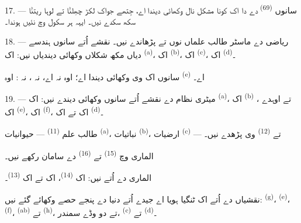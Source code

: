 17. --- سانوں  \textsuperscript{(69)} دے  دا اک
کونا مشکل نال وکھائی دیندا اے، جِتھے جواک لکڑ چھِلݨا تے لوہا ریتݨا سکھ سکدے
نیں۔ ایہہ ہر سکول وچ نئیں ہوندا۔

\VUsaut{5.0mm}
\VUsaut{3.6mm}

18. --- ریاضی دے ماسٹر طالب علماں نوں  تے
 پڑھاندے نیں۔ نقشے اُتے سانوں ہندسے دیاں مکھ شکلاں وکھائی
دیندیاں نیں: اک  \textsuperscript{(a)}، اک 
\textsuperscript{(b)}، اک  \textsuperscript{(c)}، اک 
\textsuperscript{(d)}۔

سانوں اک  وی وکھائی دیندا اے؛ اوہ نہ  اے، نہ
، نہ : اوہ  \textsuperscript{(e)} اے۔

19. --- میٹری نظام دے نقشے اُتے سانوں وکھائی دیندے نیں: اک 
\textsuperscript{(a)}، اک  \textsuperscript{(b)} تے اوہدے
، اک  \textsuperscript{(e)}، اک 
\textsuperscript{(f)}، اک  تے اک 
\textsuperscript{(d)}۔

طالب علم  \textsuperscript{(11)} --- حیوانیات
\textsuperscript{(a)}، نباتیات \textsuperscript{(b)}، ارضیات \textsuperscript{(c)}
--- تے  \textsuperscript{(12)} وی پڑھدے نیں۔

الماری وچ  \textsuperscript{(15)} تے 
\textsuperscript{(16)} دے سامان رکھے نیں۔

الماری دے اُتے نیں: اک  \textsuperscript{(14)}، اک 
تے اک  \textsuperscript{(13)}۔

نقشیاں دے اُتے اک  ٹنگیا ہویا اے جیدے اُتے دنیا دے پنجے حصے وکھائے
گئے نیں:  \textsuperscript{(g)}، 
\textsuperscript{(e)}،  \textsuperscript{(f)}، 
\textsuperscript{(ab)} تے  \textsuperscript{(h)}، تے دو وڈے
سمندر،  \textsuperscript{(c)} تے 
\textsuperscript{(d)}۔
\VUsaut{6.0mm}
\VUfilet{22mm}
